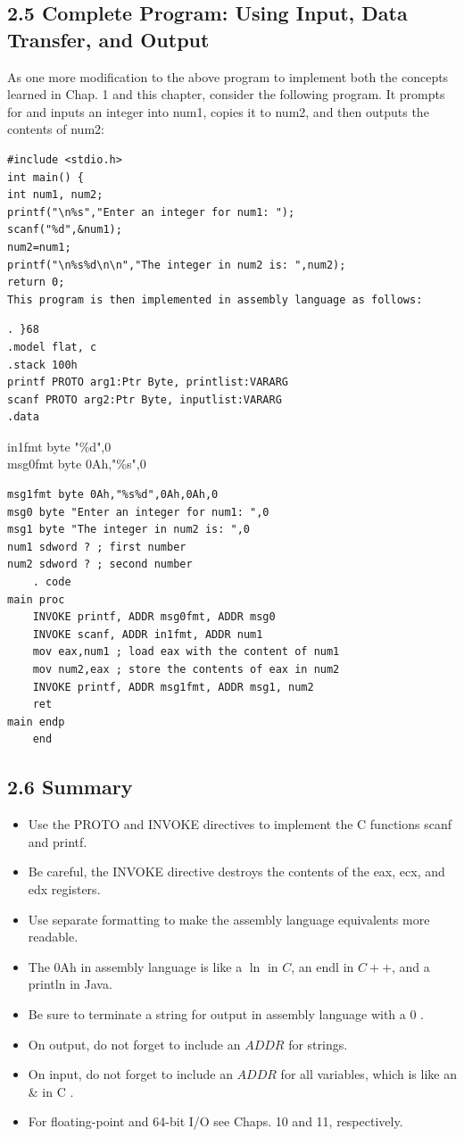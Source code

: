 \documentclass[10pt]{book}
\begin{document}
\subsection*{2.5 Complete Program: Using Input, Data Transfer, and Output}
As one more modification to the above program to implement both the concepts learned in Chap. 1 and this chapter, consider the following program. It prompts for and inputs an integer into num1, copies it to num2, and then outputs the contents of num2:

\begin{verbatim}
#include <stdio.h>
int main() {
int num1, num2;
printf("\n%s","Enter an integer for num1: ");
scanf("%d",&num1);
num2=num1;
printf("\n%s%d\n\n","The integer in num2 is: ",num2);
return 0;
This program is then implemented in assembly language as follows:
\end{verbatim}

\begin{verbatim}
. }68
.model flat, c
.stack 100h
printf PROTO arg1:Ptr Byte, printlist:VARARG
scanf PROTO arg2:Ptr Byte, inputlist:VARARG
.data
\end{verbatim}

in1fmt byte "\%d",0\\
msg0fmt byte 0Ah,"\%s",0

\begin{verbatim}
msg1fmt byte 0Ah,"%s%d",0Ah,0Ah,0
msg0 byte "Enter an integer for num1: ",0
msg1 byte "The integer in num2 is: ",0
num1 sdword ? ; first number
num2 sdword ? ; second number
    . code
main proc
    INVOKE printf, ADDR msg0fmt, ADDR msg0
    INVOKE scanf, ADDR in1fmt, ADDR num1
    mov eax,num1 ; load eax with the content of num1
    mov num2,eax ; store the contents of eax in num2
    INVOKE printf, ADDR msg1fmt, ADDR msg1, num2
    ret
main endp
    end
\end{verbatim}

\subsection*{2.6 Summary}
\begin{itemize}
  \item Use the PROTO and INVOKE directives to implement the C functions scanf and printf.
  \item Be careful, the INVOKE directive destroys the contents of the eax, ecx, and edx registers.
  \item Use separate formatting to make the assembly language equivalents more readable.
  \item The 0Ah in assembly language is like a $\ln$ in $C$, an endl in $C++$, and a println in Java.
  \item Be sure to terminate a string for output in assembly language with a 0 .
  \item On output, do not forget to include an $A D D R$ for strings.
  \item On input, do not forget to include an $A D D R$ for all variables, which is like an \& in C .
  \item For floating-point and 64-bit I/O see Chaps. 10 and 11, respectively.
\end{itemize}
\end{document}
